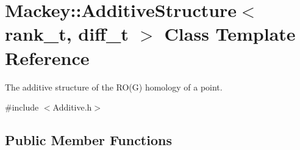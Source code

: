 \hypertarget{classMackey_1_1AdditiveStructure}{}\section{Mackey\+:\+:Additive\+Structure$<$ rank\+\_\+t, diff\+\_\+t $>$ Class Template Reference}
\label{classMackey_1_1AdditiveStructure}


The additive structure of the R\+O(\+G) homology of a point.  




{\ttfamily \#include $<$Additive.\+h$>$}

\subsection*{Public Member Functions}
